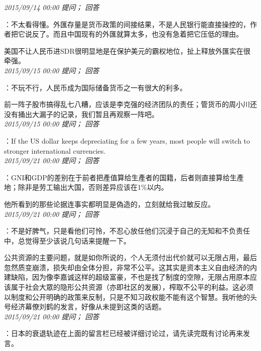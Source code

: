 \documentclass[twocolumn]{ctexart}
\begin{document}
\textit{\hfill\noindent\small 2015/09/14 00:00 提问； 回答}

：不太看得懂。外匯存量是货币政策的间接结果，不是人民银行能直接操控的，作者把它说反了。而且中国现有的外匯就算太多，也没有急着把它压低的理由。

美国不让人民币进SDR很明显地是在保护美元的霸权地位，扯上释放外匯实在很牵强。\\

\textit{\hfill\noindent\small 2015/09/15 00:00 提问； 回答}

：不玩不行，人民币成为国际储备货币之一有很大的利多。

前一阵子股市搞得乱七八糟，应该是李克强的经济团队的责任；管货币的周小川还没有捅出大漏子的记录，我们暂且再观察一阵吧。\\

\textit{\hfill\noindent\small 2015/09/15 00:00 提问； 回答}

：If the US dollar keeps depreciating for a few years, most people will switch to stronger international currencies.\\

\textit{\hfill\noindent\small 2015/09/21 00:00 提问； 回答}

：GNI和GDP的差别在于前者把產值算给生產者的国籍，后者则直接算给生產地；除非是劳工输出大国，否则差异应该在1\%以内。

他所看到的那些论据连事实都明显是偽造的，立刻就给我过敏反应。\\

\textit{\hfill\noindent\small 2015/09/21 00:00 提问； 回答}

：不是好脾气，只是看他们可怜，不忍心放任他们沉浸于自己的无知和不负责任中，总觉得至少该说几句话来提醒一下。

公共资源的主要问题，就是如你所说的，个人无须付出代价就可以无限占用，最后忽然质变崩溃，损失却由全体分担，非常不公平。这其实是资本主义自由经济的内建缺陷，因为像李嘉诚这样的超级富豪，不也是找了制度的空隙，无限占用原本应该属于社会大眾的隐形公共资源（亦即社区的发展），榨取不公平的利益。这必须以制度和公开明确的政策来反制，只是不知习政权能不能有这个智慧。我听他的头号经济幕僚刘鹤的发言，好像从未提到这类的话题。\\

\textit{\hfill\noindent\small 2015/09/21 00:00 提问； 回答}

：日本的衰退轨迹在上面的留言栏已经被详细讨论过，请先读完既有讨论再来发言。
\end{document}
